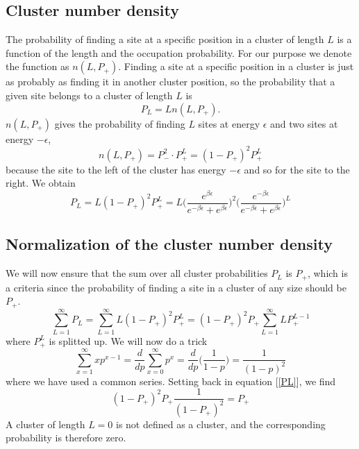 \documentclass[norsk,a4paper,12pt]{article}
\begin{document}
\subsection{Cluster number density}
The probability of finding a site at a specific position in a cluster of length $L$ is a function of the length and the occupation probability. For our purpose we denote the function as $n(L, P_+)$. Finding a site at a specific position in a cluster is just as probably as finding it in another cluster position, so the probability that a given site belongs to a cluster of length $L$ is 
\begin{equation}
P_L=Ln(L, P_+).
\end{equation}
$n(L, P_+)$ gives the probability of finding $L$ sites at energy $\epsilon$ and two sites at energy $-\epsilon$, 
\begin{equation}
n(L, P_+) = P_-^2\cdot P_+^L = (1-P_+)^2P_+^L
\end{equation}
because the site to the left of the cluster has energy $-\epsilon$ and so for the site to the right. We obtain 
\begin{equation}
P_L=L(1-P_+)^2P_+^L=L\bigg(\frac{e^{\beta\epsilon}}{e^{-\beta\epsilon}+e^{\beta\epsilon}}\bigg)^2\bigg(\frac{e^{-\beta\epsilon}}{e^{-\beta\epsilon}+e^{\beta\epsilon}}\bigg)^L
\end{equation}

\subsection{Normalization of the cluster number density}
We will now ensure that the sum over all cluster probabilities $P_L$ is $P_+$, which is a criteria since the probability of finding a site in a cluster of any size should be $P_+$. 
\begin{equation}
\sum_{L=1}^{\infty}P_L=\sum_{L=1}^{\infty}L(1-P_+)^2P_+^L=(1-P_+)^2P_+\sum_{L=1}^{\infty}LP_+^{L-1}
\label{PL}
\end{equation}
where $P_+^L$ is splitted up. We will now do a trick 
\begin{equation}
\sum_{x=1}^{\infty}xp^{x-1}=\frac{d}{dp}\sum_{x=0}^{\infty}p^x=\frac{d}{dp}\Big(\frac{1}{1-p}\Big)=\frac{1}{(1-p)^2}
\end{equation}
where we have used a common series. Setting back in equation [\ref{PL}], we find
\begin{equation}
(1-P_+)^2P_+\frac{1}{(1-P_+)^2}=P_+
\end{equation}
A cluster of length $L=0$ is not defined as a cluster, and the corresponding probability is therefore zero. 
\end{document}
